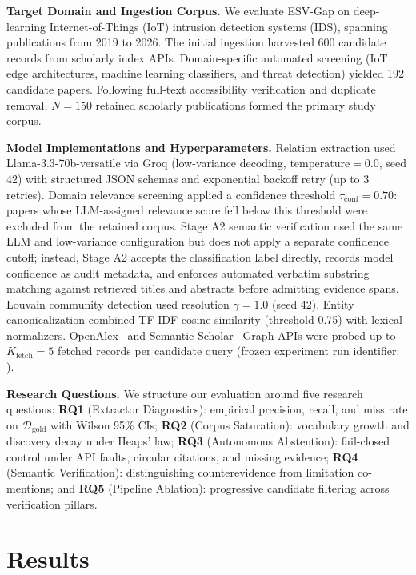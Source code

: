 \documentclass[runningheads]{llncs}
\newcommand{\method}{ESV-Gap}
\begin{document}
\noindent\textbf{Target Domain and Ingestion Corpus.} We evaluate \method{} on deep-learning Internet-of-Things (IoT) intrusion detection systems (IDS), spanning publications from 2019 to 2026. The initial ingestion harvested 600 candidate records from scholarly index APIs. Domain-specific automated screening (IoT edge architectures, machine learning classifiers, and threat detection) yielded 192 candidate papers. Following full-text accessibility verification and duplicate removal, $N = 150$ retained scholarly publications formed the primary study corpus.

\noindent\textbf{Model Implementations and Hyperparameters.} Relation extraction used Llama-3.3-70b-versatile via Groq (low-variance decoding, $\text{temperature} = 0.0$, seed 42) with structured JSON schemas and exponential backoff retry (up to 3 retries). Domain relevance screening applied a confidence threshold $\tau_{\text{conf}} = 0.70$: papers whose LLM-assigned relevance score fell below this threshold were excluded from the retained corpus. Stage A2 semantic verification used the same LLM and low-variance configuration but does not apply a separate confidence cutoff; instead, Stage A2 accepts the classification label directly, records model confidence as audit metadata, and enforces automated verbatim substring matching against retrieved titles and abstracts before admitting evidence spans. Louvain community detection used resolution $\gamma = 1.0$ (seed 42). Entity canonicalization combined TF-IDF cosine similarity (threshold 0.75) with lexical normalizers. OpenAlex~\cite{openalex2022} and Semantic Scholar~\cite{semanticscholar2023} Graph APIs were probed up to $K_{\text{fetch}} = 5$ fetched records per candidate query (frozen experiment run identifier: ).

\noindent\textbf{Research Questions.} We structure our evaluation around five research questions: \textbf{RQ1} (Extractor Diagnostics): empirical precision, recall, and miss rate on $\mathcal{D}_{\text{gold}}$ with Wilson 95\% CIs; \textbf{RQ2} (Corpus Saturation): vocabulary growth and discovery decay under Heaps' law; \textbf{RQ3} (Autonomous Abstention): fail-closed control under API faults, circular citations, and missing evidence; \textbf{RQ4} (Semantic Verification): distinguishing counterevidence from limitation co-mentions; and \textbf{RQ5} (Pipeline Ablation): progressive candidate filtering across verification pillars.

\section{Results}
\label{sec:results}
\end{document}
